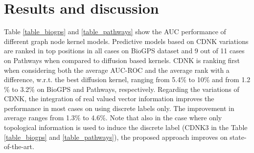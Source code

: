\section{Results and discussion}
Table \ref{table_biogps} and \ref{table_pathways} show the AUC performance of different graph node kernel models. Predictive models based on CDNK variations are ranked in top positions in all cases on BioGPS dataset and 9 out of 11 cases on Pathways when compared to diffusion based kernels. CDNK is ranking first when considering both the average AUC-ROC and the average rank with a difference, w.r.t. the best diffusion kernel, ranging from 5.4$\%$ to 10$\%$ and from 1.2$\%$ to 3.2$\%$ on BioGPS and Pathways, respectively. Regarding the variations of CDNK, the integration of real valued vector information improves the performance in most cases on using discrete labels only. The improvement in average ranges from 1.3$\%$ to 4.6$\%$. Note that also in the case where only topological information is used to induce the discrete label (CDNK3 in the Table \ref{table_biogps} and \ref{table_pathways}), the proposed approach improves on state-of-the-art. 


